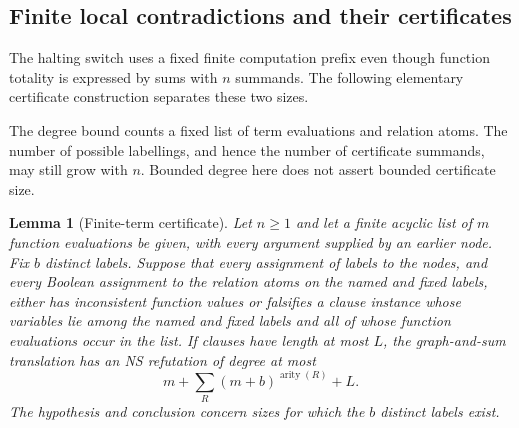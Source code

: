 \documentclass[11pt,a4paper]{article}
\newtheorem{lemma}[theorem]{Lemma}
\theoremstyle{definition}\newtheorem{definition}[theorem]{Definition}
\theoremstyle{remark}\newtheorem{remark}[theorem]{Remark}
\begin{document}
\subsection{Finite local contradictions and their certificates}
\label{app:finite-certificate}
The halting switch uses a fixed finite computation prefix even though
function totality is expressed by sums with $n$ summands. The following
elementary certificate construction separates these two sizes.

The degree bound counts a fixed list of term evaluations and relation
atoms. The number of possible labellings, and hence the number of
certificate summands, may still grow with $n$. Bounded degree here
does not assert bounded certificate size.

\begin{lemma}[Finite-term certificate]\label{lem:finite-certificate}
Let $n\ge1$ and let a finite acyclic list of $m$ function evaluations be given, with every
argument supplied by an earlier node. Fix $b$ distinct labels. Suppose that
every assignment of labels to the nodes, and every Boolean assignment to
the relation atoms on the named and fixed labels, either has inconsistent
function values or falsifies a clause instance whose variables lie among the named and fixed
labels and all of whose function evaluations occur in the list. If clauses have length at most $L$, the
graph-and-sum translation has an NS refutation of degree at most
\[
                 m+\sum_R(m+b)^{\operatorname{arity}(R)}+L.
\]
The hypothesis and conclusion concern sizes for which the $b$ distinct
labels exist.
\end{lemma}
\end{document}
